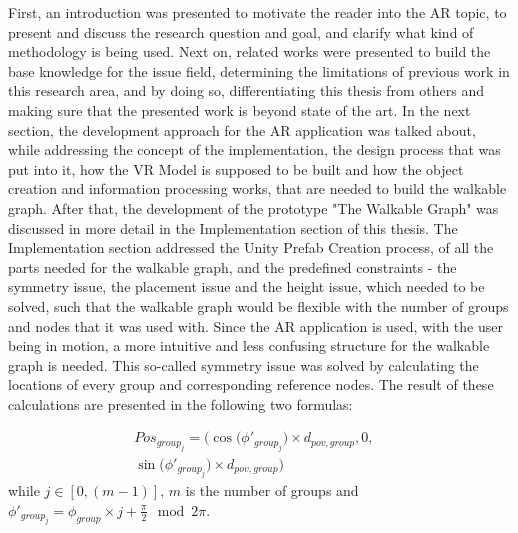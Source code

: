 \documentclass[12pt,a4paper,oneside,american,parskip=half]{article}
\begin{document}
\begin{justify}
\begin{normalsize}
First, an introduction was presented to motivate the reader into the AR topic, to present and discuss the research question and goal, and clarify what kind of methodology is being used.
Next on, related works were presented to build the base knowledge for the issue field, determining the limitations of previous work in this research area, and by doing so, differentiating this thesis from others and making sure that the presented work is beyond state of the art. In the next section, the development approach for the AR application was talked about, while addressing the concept of the implementation, the design process that was put into it, how the VR Model is supposed to be built and how the object creation and information processing works, that are needed to build the walkable graph.
\newline
After that, the development of the prototype "The Walkable Graph" was discussed in more detail in the Implementation section of this thesis. The Implementation section addressed the Unity Prefab Creation process, of all the parts needed for the walkable graph, and the predefined constraints - the symmetry issue, the placement issue and the height issue, which needed to be solved, such that the walkable graph would be flexible with the number of groups and nodes that it was used with.
\newline
Since the AR application is used, with the user being in motion, a more intuitive and less confusing structure for the walkable graph is needed.
This so-called symmetry issue was solved by calculating the locations of every group and corresponding reference nodes. The result of these calculations are presented in the following two formulas:

\begin{align*}
Pos_{group_{j}} = \Big(\cos \big(\phi'_{group_j} \big) \times d_{pov, group} , 0, & \\
\sin \big(\phi'_{group_j}\big) \times d_{pov, group} \Big) &
\end{align*} while $ j \in [0, (m - 1)]$, $m$ is the number of groups and $\phi'_{group_{j}} = \phi_{group} \times j + \frac{\pi}{2} \mod 2\pi$.


\end{normalsize}
\end{justify}
\end{document}
